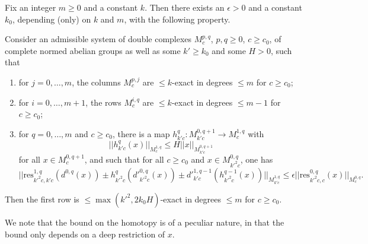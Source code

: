 \begin{proposition}
  \label{spectral}
  Fix an integer $m\geq 0$ and a constant $k$.
  Then there exists an $\epsilon>0$ and a constant $k_0$,
  depending (only) on $k$ and $m$, with the following property.

  Consider an admissible system of double complexes $M^{p,q}_c$, $p,q\geq 0$, $c\geq c_0$,
  of complete normed abelian groups as well as some $k'\geq k_0$ and some $H>0$, such that
  \begin{center}
  \end{center}
  \begin{enumerate}
  \item for $j=0,\ldots,m$, the columns $M^{p,j}_c$ are $\leq k$-exact in degrees $\leq m$ for $c\geq c_0$;
  \item for $i=0,\ldots,m+1$, the rows $M^{i,q}_c$ are $\leq k$-exact in degrees $\leq m-1$ for $c\geq c_0$;
  \item for $q=0,\ldots,m$ and $c\geq c_0$, there is a map $h^q_{k'c}: M^{0,q+1}_{k'c}\to M^{1,q}_c$ with
  \[
  ||h^q_{k'c}(x)||_{M^{1,q}_c}\leq H||x||_{M^{0,q+1}_{k'c}}
  \]
  for all $x\in M^{0,q+1}_c$, and such that for all $c\geq c_0$ and $x\in M^{0,q}_{k'^2c}$, one has
  \begin{equation}\label{eq:homotopicmapsmall}
  ||\mathrm{res}_{k'^2c,k'c}^{1,q}(d^{0,q}(x))\pm h^q_{k'^2c}(d'^{0,q}_{k'^2c}(x))\pm d'^{1,q-1}_{k'c}(h^{q-1}_{k'^2c}(x))||_{M^{1,q}_{k'c}}\leq \epsilon ||\mathrm{res}_{k'^2c,c}^{0,q}(x)||_{M^{0,q}_c}.
  \end{equation}
  \end{enumerate}
  Then the first row is $\leq \max(k'^2,2k_0H)$-exact in degrees $\leq m$ for $c\geq c_0$.
\end{proposition}

We note that the bound on the homotopy is of a peculiar nature, in that the bound only depends on a deep restriction of $x$.

